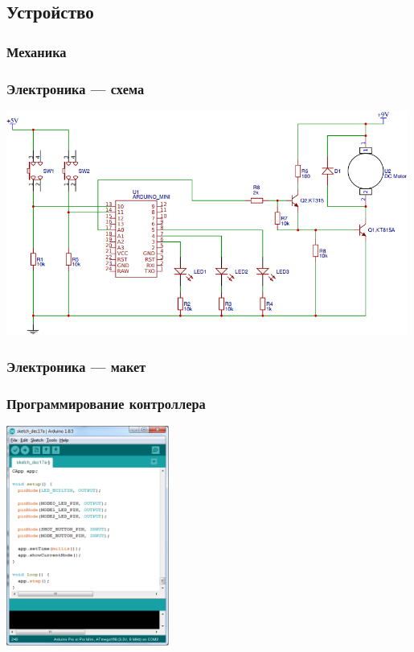 \subsection{Устройство}

\begin{frame}
    \frametitle{Механика \myDevice}
    
    \begin{center}
    \end{center}
\end{frame}

\begin{frame}
    \frametitle{Электроника {\myDevice} --- схема}
    
    \begin{center}
        \includegraphics[width=0.99\textwidth]{fig/eScheme}
    \end{center}
\end{frame}

\begin{frame}
    \frametitle{Электроника {\myDevice} --- макет}
    
    \begin{center}
    \end{center}
\end{frame}

\begin{frame}
    \frametitle{Программирование контроллера \myDevice}
    
    \begin{center}
        \includegraphics[width=0.4\textwidth]{fig/programming}
    \end{center}
\end{frame}

